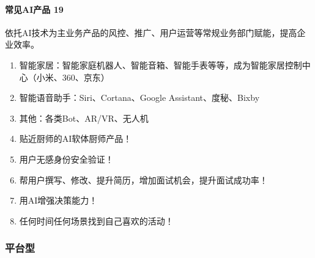 \documentclass[letterpaper,10pt,english]{sphinxmanual}
\begin{document}
\paragraph{常见AI产品 19\sphinxfootnotemark[125]}
\label{\detokenize{chapter_introduction/2C:ai-19}}%
\begin{footnotetext}[125]\sphinxAtStartFootnote
{}
%
\end{footnotetext}\ignorespaces 
依托AI技术为主业务产品的风控、推广、用户运营等常规业务部门赋能，提高企业效率。%
\begin{footnote}[126]\sphinxAtStartFootnote
{}
%
\end{footnote}
\begin{enumerate}
%
\item {} 
智能家居：智能家庭机器人、智能音箱、智能手表等等，成为智能家居控制中心（小米、360、京东）

\item {} 
智能语音助手：Siri、Cortana、Google Assistant、度秘、Bixby

\item {} 
其他：各类Bot、AR/VR、无人机

\item {} 
贴近厨师的AI软体厨师产品！%
\begin{footnote}[127]\sphinxAtStartFootnote
{}
%
\end{footnote}

\item {} 
用户无感身份安全验证！

\item {} 
帮用户撰写、修改、提升简历，增加面试机会，提升面试成功率！

\item {} 
用AI增强决策能力！

\item {} 
任何时间任何场景找到自己喜欢的活动！

\end{enumerate}


\subsubsection{平台型}
\label{\detokenize{chapter_introduction/platform:id1}}\label{\detokenize{chapter_introduction/platform::doc}}
\end{document}
